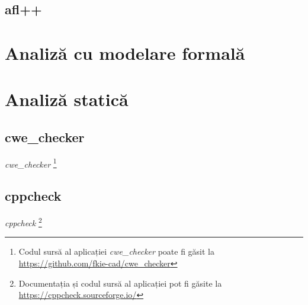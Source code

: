 \subsection{afl++}


\section{Analiză cu modelare formală}


\section{Analiză statică}

\subsection{cwe\_checker} 

\textit{cwe\_checker} \footnote{Codul sursă al aplicației \textit{cwe\_checker} poate fi găsit la \url{https://github.com/fkie-cad/cwe_checker}}


\subsection{cppcheck}

\textit{cppcheck} \footnote{Documentația și codul sursă al aplicației pot fi găsite la \url{https://cppcheck.sourceforge.io/}}